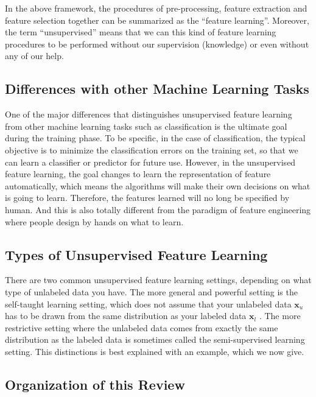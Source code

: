 \documentclass[conference]{IEEEtran}
\begin{document}
In the above framework, the procedures of pre-processing, feature extraction and feature selection together can be summarized as the ``feature learning''. 
Moreover, the term ``unsupervised'' means that we can this kind of feature learning procedures to be performed without our supervision (knowledge) or even without any of our help.

\subsection{Differences with other Machine Learning Tasks}



One of the major differences that distinguishes unsupervised feature learning from other machine learning tasks such as classification is the ultimate goal during the training phase. To be specific, in the case of classification, the typical objective is to minimize the classification errors on the training set, so that we can learn a classifier or predictor for future use. However, in the unsupervised feature learning, the goal changes to learn the representation of feature automatically, which means the algorithms will make their own decisions on what is going to learn. Therefore, the features learned will no long be specified by human. And this is also totally different from the paradigm of feature engineering where people design by hands on what to learn.

\subsection{Types of Unsupervised Feature Learning}

There are two common unsupervised feature learning settings, depending on what type of unlabeled data you have. The more general and powerful setting is the self-taught learning setting, which does not assume that your unlabeled data $\mathbf{x}_u$ has to be drawn from the same distribution as your labeled data $\mathbf{x}_l$ \cite{self_taught}. The more restrictive setting where the unlabeled data comes from exactly the same distribution as the labeled data is sometimes called the semi-supervised learning setting. This distinctions is best explained with an example, which we now give.

\subsection{Organization of this Review}
\end{document}
